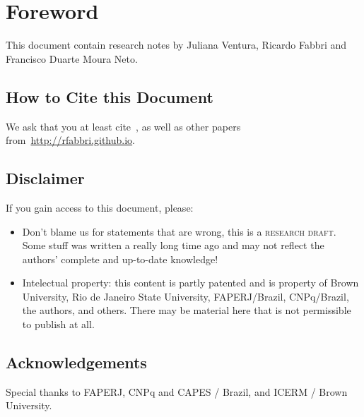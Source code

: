 \pagestyle{fancy}
\fancyhf{}
\fancyfoot[LE,LO,RE,RO]{\thepage}

\tableofcontents
\pagestyle{fancy}
\fancyhf{}
\fancyfoot[LE,LO,RE,RO]{\thepage}

\chapter{Foreword}

This document contain research notes by Juliana Ventura, Ricardo Fabbri
and Francisco Duarte Moura Neto. 

\section*{How to Cite this Document}
We ask that you at least
cite~\cite{Fabbri:Kimia:IJCV2016,Fabbri:Kimia:Giblin:ECCV12},
as well as other papers from~\url{http://rfabbri.github.io}.

\section*{Disclaimer}
If you gain access to this document, please:
\begin{itemize}
\item Don't blame us for statements that are wrong, this is a \textsc{research
  draft}. Some stuff was written a really long time ago and may not reflect the
  authors' complete and up-to-date knowledge!
\item Intelectual property: this content is partly patented and is property of Brown
  University, Rio de Janeiro State University, FAPERJ/Brazil, CNPq/Brazil, the
  authors, and others. There may be material here that is not permissible to publish at all.
\end{itemize}

\section*{Acknowledgements}
Special thanks to FAPERJ, CNPq and CAPES / Brazil, and ICERM / Brown University.

\mainmatter
\fancyhead[LE]{\nouppercase{\leftmark}}
\fancyhead[RE]{\thepage}
\fancyhead[LO]{\nouppercase{\rightmark}}
\fancyhead[RO]{\thepage}





%

%



